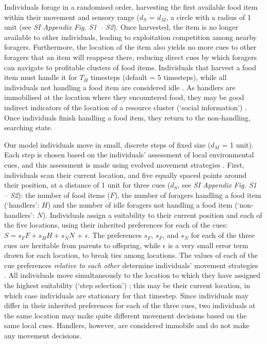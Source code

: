 Individuals forage in a randomised order, harvesting the first available food item within their movement and sensory range ($d_S$ = $d_M$, a circle with a radius of 1 unit (see \textit{SI Appendix Fig. S1 -- S2}).
Once harvested, the item is no longer available to other individuals, leading to exploitation competition among nearby foragers.
Furthermore, the location of the item also yields no more cues to other foragers that an item will reappear there, reducing direct cues by which foragers can navigate to profitable clusters of food items.
Individuals that harvest a food item must handle it for $T_H$ timesteps (default = 5 timesteps), while all individuals not handling a food item are considered idle \autocite{ruxton1992,gupte2021a}.
As handlers are immobilised at the location where they encountered food, they may be good indirect indicators of the location of a resource cluster (`social information') \autocite[][]{danchin2004,romano2020,gupte2021a}.
Once individuals finish handling a food item, they return to the non-handling, searching state.

Our model individuals move in small, discrete steps of fixed size ($d_M$ = 1 unit).
Each step is chosen based on the individuals' assessment of local environmental cues, and this assessment is made using evolved movement strategies \autocite[as in][]{netz2021,gupte2021a}.
First, individuals scan their current location, and five equally spaced points around their position, at a distance of 1 unit for three cues ($d_S$, see \textit{SI Appendix Fig. S1 -- S2}): the number of food items ($F$), the number of foragers handling a food item (`handlers': $H$) and the number of idle foragers not handling a food item (`non-handlers': $N$).
Individuals assign a suitability \autocite[see][]{netz2021,gupte2021a} to their current position and each of the five locations, using their inherited preferences for each of the cues: $S = s_FF + s_HH + s_NN$ + $\epsilon$.
The preferences $s_F$, $s_F$, and $s_N$ for each of the three cues are heritable from parents to offspring, while $\epsilon$ is a very small error term drawn for each location, to break ties among locations.
The values of each of the cue preferences \emph{relative to each other} determine individuals' movement strategies \autocite{gupte2021a}.
All individuals move simultaneously to the location to which they have assigned the highest suitability (`step selection') \autocite[akin to step-selection;][]{fortin2005}; this may be their current location, in which case individuals are stationary for that timestep.
Since individuals may differ in their inherited preferences for each of the three cues, two individuals at the same location may make quite different movement decisions based on the same local cues.
Handlers, however, are considered immobile and do not make any movement decisions.

